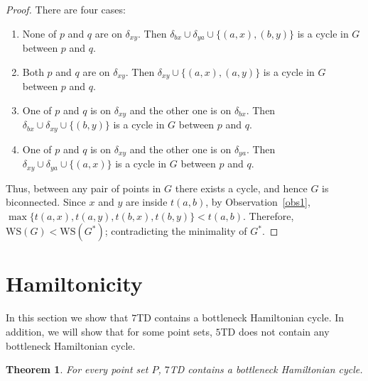 \documentclass[11pt,a4paper]{article}
\newcommand{\kTD}[2]{$#1$\text{-}TD#2}
\newcommand{\WS}[1]{\text{WS$(#1)$}}
\newtheorem{theorem}{Theorem}
\begin{document}
\begin{proof}
There are four cases:
\begin{enumerate}
 \item None of $p$ and $q$ are on $\delta_{xy}$. Then $\delta_{bx}\cup \delta_{ya} \cup \{(a,x),(b,y)\}$ is a cycle in $G$ between $p$ and $q$.
 \item Both $p$ and $q$ are on $\delta_{xy}$. Then $\delta_{xy}\cup \{(a,x),(a,y)\}$ is a cycle in $G$ between $p$ and $q$.
 \item One of $p$ and $q$ is on $\delta_{xy}$ and the other one is on $\delta_{bx}$. Then $\delta_{bx}\cup\delta_{xy}\cup\{(b,y)\}$ is a cycle in $G$ between $p$ and $q$.
 \item One of $p$ and $q$ is on $\delta_{xy}$ and the other one is on $\delta_{ya}$. Then $\delta_{xy}\cup\delta_{ya}\cup\{(a,x)\}$ is a cycle in $G$ between $p$ and $q$.
\end{enumerate}

Thus, between any pair of points in $G$ there exists a cycle, and hence $G$ is biconnected. Since $x$ and $y$ are inside $t(a,b)$, by Observation~\ref{obs1}, $\max\{t(a,x), t(a, y), t(b,x),t(b,y)\}<t(a,b)$. Therefore, $\WS{G}<\WS{G^*}$; contradicting the minimality of $G^*$.   
\end{proof}


\section{Hamiltonicity}
\label{Hamiltonicity}

In this section we show that \kTD{7}{} contains a bottleneck Hamiltonian cycle. In addition, we will show that for some point sets, \kTD{5}{} does not contain any bottleneck Hamiltonian cycle.


\begin{theorem}
\label{hamiltonicity-thr}
 For every point set $P$, \kTD{7}{} contains a bottleneck Hamiltonian cycle.
\end{theorem}
\end{document}
